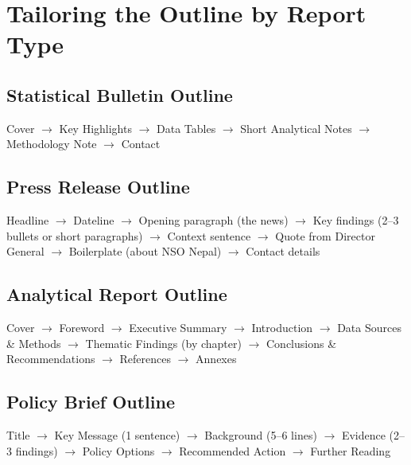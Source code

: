 \documentclass[11pt,a4paper,oneside]{book}
\begin{document}
\section{Tailoring the Outline by Report Type}

\subsection*{Statistical Bulletin Outline}
\begin{tcolorbox}[nsolightbox]
Cover $\rightarrow$ Key Highlights $\rightarrow$ Data Tables $\rightarrow$ Short Analytical Notes $\rightarrow$ Methodology Note $\rightarrow$ Contact
\end{tcolorbox}

\subsection*{Press Release Outline}
\begin{tcolorbox}[nsolightbox]
Headline $\rightarrow$ Dateline $\rightarrow$ Opening paragraph (the news) $\rightarrow$ Key findings (2--3 bullets or short paragraphs) $\rightarrow$ Context sentence $\rightarrow$ Quote from Director General $\rightarrow$ Boilerplate (about NSO Nepal) $\rightarrow$ Contact details
\end{tcolorbox}

\subsection*{Analytical Report Outline}
\begin{tcolorbox}[nsolightbox]
Cover $\rightarrow$ Foreword $\rightarrow$ Executive Summary $\rightarrow$ Introduction $\rightarrow$ Data Sources \& Methods $\rightarrow$ Thematic Findings (by chapter) $\rightarrow$ Conclusions \& Recommendations $\rightarrow$ References $\rightarrow$ Annexes
\end{tcolorbox}

\subsection*{Policy Brief Outline}
\begin{tcolorbox}[nsolightbox]
Title $\rightarrow$ Key Message (1 sentence) $\rightarrow$ Background (5--6 lines) $\rightarrow$ Evidence (2--3 findings) $\rightarrow$ Policy Options $\rightarrow$ Recommended Action $\rightarrow$ Further Reading
\end{tcolorbox}
\end{document}

